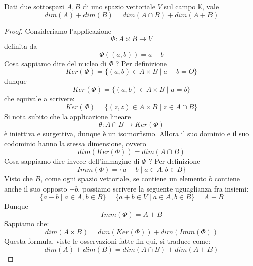 \begin{theorem}[Grassmann]
	Dati due sottospazi $A, B$ di uno spazio vettoriale $V$ sul campo
	$\mathbb{K}$, vale
	\begin{equation*}
		dim(A) + dim(B) = dim(A \cap B) + dim(A + B)
	\end{equation*}
	\begin{proof}
		Consideriamo l'applicazione
		\begin{equation*}
			\Phi : A \times B \to V
		\end{equation*}
		definita da
		\[ \Phi((a, b)) = a - b \]
		Cosa sappiamo dire del nucleo di $\Phi$ ? Per definizione
		\begin{equation*}
			Ker(\Phi) = \{(a, b) \in A \times B \mid a - b = O\}
		\end{equation*}
		dunque
		\begin{equation*}
			Ker(\Phi) = \{(a, b) \in A \times B \mid a = b\}
		\end{equation*}
		che equivale a scrivere:
		\begin{equation*}
			Ker(\Phi) = \{(z, z) \in A \times B \mid z \in A \cap B\}
		\end{equation*}
		Si nota subito che la applicazione lineare
		\[ \theta : A \cap B \to Ker(\Phi) \]
		\`e iniettiva e surgettiva, dunque \`e un isomorfismo. Allora il suo dominio e
		il suo codominio hanno la stessa dimensione, ovvero
		\begin{equation*}
			dim(Ker(\Phi)) = dim(A \cap B)
		\end{equation*}
		Cosa sappiamo dire invece dell'immagine di $\Phi$ ? Per definizione
		\begin{equation*}
			Imm(\Phi) = \{a - b \mid a \in A, b \in B\}
		\end{equation*}
		Visto che $B$, come ogni spazio vettoriale, se contiene un elemento
		$b$ contiene anche il suo opposto $-b$, possiamo scrivere la seguente
		uguaglianza fra insiemi:
		\begin{equation*}
			\{ a - b \mid a \in A, b \in B \} =
			\{ a + b \in V \mid a \in A, b \in B \} =
			A + B
		\end{equation*}
		Dunque
		\begin{equation*}
			Imm(\Phi) = A + B
		\end{equation*}
		Sappiamo che:
		\begin{equation*}
			dim(A \times B) = dim(Ker(\Phi)) + dim(Imm(\Phi))
		\end{equation*}
		Questa formula, viste le osservazioni fatte fin qui, si traduce come:
		\begin{equation*}
			dim(A) + dim(B) = dim(A \cap B) + dim(A + B)
		\end{equation*}
	\end{proof}
\end{theorem}

